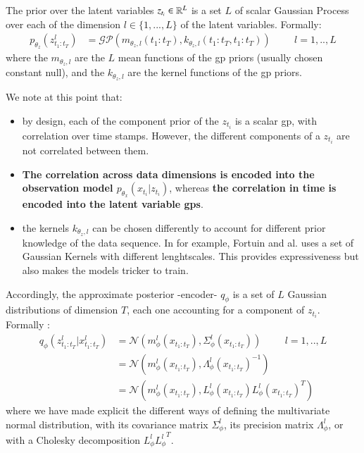 The prior over the latent variables $z_{t_i} \in \mathbb{R}^L$ is a set $L$ of scalar Gaussian Process over each of the dimension $l \in \{1,...,L\}$ of the latent variables. Formally:
\begin{align}
    p_{\theta_z}(z_{t_1:t_T}^l) &= \mathcal{GP}(m_{\theta_z, l}(t_1:t_T), k_{\theta_z, l}(t_1:t_T, t_1:t_T)) \hspace{1cm} l=1,..,L
\end{align}
where the $m_{\theta_z, l}$ are the $L$ mean functions of the \gls{gp} priors (usually chosen constant null), and the $k_{\theta_z, l}$ are the kernel functions of the \gls{gp} priors.

We note at this point that:
\begin{itemize}
    \item by design, each of the component prior of the $z_{t_i}$ is a scalar \gls{gp}, with correlation over time stamps. However, the different components of a $z_{t_i}$ are not correlated between them. 
    \item \textbf{The correlation across data dimensions is encoded into the observation model $p_{\theta_x}(x_{t_i} \vert z_{t_i})$}, whereas \textbf{the correlation in time is encoded into the 
    latent variable \glspl{gp}}.
    \item the kernels $k_{\theta_z, l}$ can be chosen differently to account for different prior knowledge of the data sequence. 
    In \cite{fortuin_gp-vae:_2020} for example, Fortuin and al. uses a set of Gaussian Kernels with different lenghtscales. This provides expressiveness 
    but also makes the models tricker to train.
\end{itemize}

Accordingly, the approximate posterior -encoder- $q_\phi$ is a set of $L$ Gaussian distributions of dimension $T$, each one accounting for a component of $z_{t_i}$. Formally :
\begin{align}
    q_\phi(z_{t_1:t_T}^l \vert x_{t_1:t_T}^l) &= \mathcal{N}(m_{\phi}^l(x_{t_1:t_T}), \Sigma_{\phi}^l(x_{t_1:t_T})) \hspace{1cm} l=1,..,L \\
    &= \mathcal{N}(m_{\phi}^l(x_{t_1:t_T}), \Lambda_{\phi}^l(x_{t_1:t_T})^{-1}) \\
    &= \mathcal{N}(m_{\phi}^l(x_{t_1:t_T}), L_{\phi}^l(x_{t_1:t_T})L_{\phi}^l(x_{t_1:t_T})^T)
\end{align}
where we have made explicit the different ways of defining the multivariate normal distribution, with its covariance matrix $\Sigma_\phi^l$, 
its precision matrix $\Lambda_\phi^l$, or with a Cholesky decomposition $L_{\phi}^l{L_{\phi}^l}^T$.

